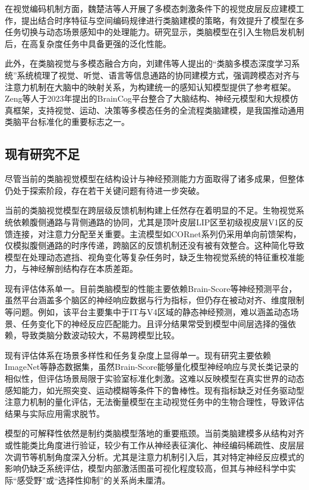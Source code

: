 在视觉编码机制方面，魏楚洁等人开展了多模态刺激条件下的视觉皮层反应建模工作，提出结合时序特征与空间编码规律进行类脑建模的策略，有效提升了模型在多任务切换与动态场景感知中的处理能力。研究显示，类脑模型在引入生物启发机制后，在高复杂度任务中具备更强的泛化性能\cite{1022019566.nh}。

此外，在类脑视觉与多模态融合方向，刘建伟等人提出的“类脑多模态深度学习系统”系统梳理了视觉、听觉、语言等信息通路的协同建模方式，强调跨模态对齐与注意力机制在大脑中的映射关系，为构建统一的感知认知模型提供了参考框架\cite{刘建伟2020多模态深度学习综述}。Zeng等人于2023年提出的BrainCog平台整合了大脑结构、神经元模型和大规模仿真框架，支持视觉、运动、决策等多模态任务的全流程类脑建模，是我国推动通用类脑平台标准化的重要标志之一\cite{zeng2023braincog}。


\subsection{现有研究不足}

尽管当前的类脑视觉模型在结构设计与神经预测能力方面取得了诸多成果，但整体仍处于探索阶段，存在若干关键问题有待进一步突破。

当前的类脑视觉模型在跨层级反馈机制构建上任然存在着明显的不足。生物视觉系统依赖腹侧通路与背侧通路的协同，尤其是顶叶皮层LIP区至初级视皮层V1区的反馈连接，对注意力分配至关重要。主流模型如CORnet系列仍采用单向前馈架构，仅模拟腹侧通路的时序传递，跨脑区的反馈机制还没有被有效整合\cite{kubilius2019brain}。这种简化导致模型在处理动态遮挡、视角变化等复杂任务时，缺乏生物视觉系统的特征重校准能力，与神经解剖结构存在本质差距。

现有评估体系单一。目前类脑模型的性能主要依赖Brain-Score等神经预测平台，虽然平台涵盖多个脑区的神经响应数据与行为指标，但仍存在被动对齐、维度限制等问题。例如，该平台主要集中于IT与V4区域的静态神经预测，难以涵盖动态场景、任务变化下的神经反应匹配能力。且评分结果常受到模型中间层选择的强依赖，导致类脑分数波动较大，不易跨模型比较。

现有评估体系在场景多样性和任务复杂度上显得单一。现有研究主要依赖ImageNet等静态数据集，虽然Brain-Score能够量化模型神经响应与灵长类记录的相似性，但评估场景局限于实验室标准化刺激。这难以反映模型在真实世界的动态感知能力，如光照突变、运动模糊等条件下的鲁棒性。现有指标缺乏对任务驱动型注意力机制的量化评估，无法衡量模型在主动视觉任务中的生物合理性，导致评估结果与实际应用需求脱节。

模型的可解释性依然是制约类脑模型落地的重要瓶颈。当前类脑建模多从结构对齐或性能类比角度进行验证，较少有工作从神经表征演化、神经编码稀疏性、皮层层次调节等机制角度深入分析。尤其是注意力机制引入后，其对特定神经反应模式的影响仍缺乏系统评估，模型内部激活图虽可视化程度较高，但其与神经科学中实际“感受野”或“选择性抑制”的关系尚未厘清\cite{bau2017network}。

